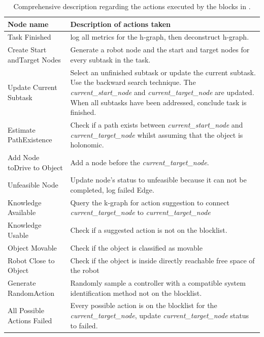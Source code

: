 \begin{table}[H]
\caption{Comprehensive description regarding the actions executed by the blocks in .}%
\label{table:explainer_h-graph_figures_nodes}
\centering
{}
\begin{tabular}%
  {>{\raggedright\arraybackslash}p{}%
    >{\raggedright\arraybackslash}p{}}
\textbf{Node name} & \textbf{Description of actions taken}\\\toprule
Task Finished & log all metrics for the \ac{h-graph}, then deconstruct \ac{h-graph}.\\
Create Start and\newline Target Nodes & Generate a robot node and the start and target nodes for every subtask in the task.\\
Update Current Subtask & Select an unfinished subtask or update the current subtask. Use the backward search technique. The \textit{current\_start\_node} and \textit{current\_target\_node} are updated. When all subtasks have been addressed, conclude task is finished. \\
Estimate Path\newline Existence & Check if a path exists between \textit{current\_start\_node} and \textit{current\_target\_node} whilst assuming that the object is holonomic.\\
Add Node to\newline Drive to Object & Add a node before the \textit{current\_target\_node}.\\
Unfeasible Node & Update node's status to unfeasible because it can not be completed, log failed Edge.\\
Knowledge Available& Query the \ac{k-graph} for action suggestion to connect \textit{current\_target\_node} to \textit{current\_target\_node}\\
Knowledge Usable& Check if a suggested action is not on the blocklist.\\
Object Movable & Check if the object is classified as movable\\
Robot Close to Object& Check if the object is inside directly reachable free space of the robot \\
Generate Random\newline Action& Randomly sample a controller with a compatible system identification method not on the blocklist. \\
All Possible Actions Failed & Every possible action is on the blocklist for the \textit{current\_target\_node}, update \textit{current\_target\_node} status to failed.\\

\end{tabular}
\end{table}
